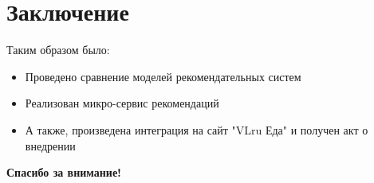 \documentclass{fefu}
\begin{document}
  \section{Заключение}
  Таким образом было:
  \begin{itemize}
    \item Проведено сравнение моделей рекомендательных систем
    \item Реализован микро-сервис рекомендаций
    \item А также, произведена интеграция на сайт "VLru Еда" и получен акт о внедрении
  \end{itemize}

  \textbf{Спасибо за внимание!}
\end{document}
